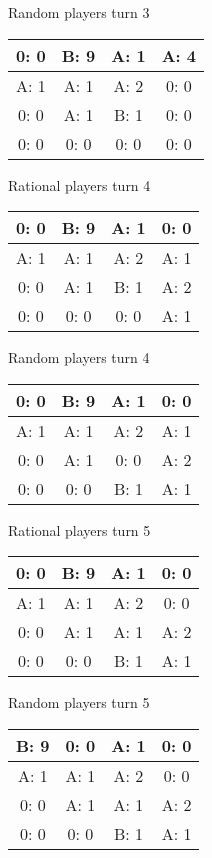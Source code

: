 \documentclass[12pt]{article}
\begin{document}
Random players turn 3
\begin{center}
\begin{tabular}{|c|c|c|c|} 
\hline
0: 0  & B: 9  & A: 1  & A: 4  \\ \hline
A: 1  & A: 1  & A: 2  & 0: 0  \\ \hline
0: 0  & A: 1  & B: 1  & 0: 0  \\ \hline
0: 0  & 0: 0  & 0: 0  & 0: 0  \\ \hline
\end{tabular} 
\end{center}

Rational players turn 4
\begin{center}
\begin{tabular}{|c|c|c|c|} 
\hline
0: 0  & B: 9  & A: 1  & 0: 0  \\ \hline
A: 1  & A: 1  & A: 2  & A: 1  \\ \hline
0: 0  & A: 1  & B: 1  & A: 2  \\ \hline
0: 0  & 0: 0  & 0: 0  & A: 1  \\ \hline
\end{tabular} 
\end{center}
Random players turn 4
\begin{center}
\begin{tabular}{|c|c|c|c|} 
\hline
0: 0  & B: 9  & A: 1  & 0: 0  \\ \hline
A: 1  & A: 1  & A: 2  & A: 1  \\ \hline
0: 0  & A: 1  & 0: 0  & A: 2  \\ \hline
0: 0  & 0: 0  & B: 1  & A: 1  \\ \hline
\end{tabular} 
\end{center}

Rational players turn 5
\begin{center}
\begin{tabular}{|c|c|c|c|} 
\hline
0: 0  & B: 9  & A: 1  & 0: 0  \\ \hline
A: 1  & A: 1  & A: 2  & 0: 0  \\ \hline
0: 0  & A: 1  & A: 1  & A: 2  \\ \hline
0: 0  & 0: 0  & B: 1  & A: 1  \\ \hline
\end{tabular} 
\end{center}
Random players turn 5
\begin{center}
\begin{tabular}{|c|c|c|c|} 
\hline
B: 9  & 0: 0  & A: 1  & 0: 0  \\ \hline
A: 1  & A: 1  & A: 2  & 0: 0  \\ \hline
0: 0  & A: 1  & A: 1  & A: 2  \\ \hline
0: 0  & 0: 0  & B: 1  & A: 1  \\ \hline
\end{tabular} 
\end{center}
\end{document}
